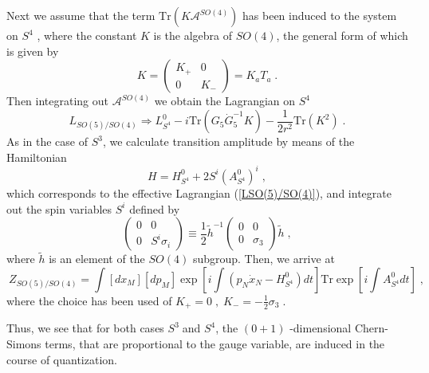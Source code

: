 \documentclass[12pt,a4paper]{article}
\begin{document}
Next we assume that the term $\mathrm{Tr}(K\mathcal{A}^{SO(4)})$ has been
induced to the system on $S^{4}$ , where the constant $K$ is the algebra of $%
SO(4)$, the general form of which is given by 
\begin{equation}
K=\left( 
\begin{array}{cc}
K_{+} & 0 \\ 
0 & K_{-}
\end{array}
\right) =K_{a}T_{a}\;.
\end{equation}
Then integrating out $\mathcal{A}^{SO(4)}$ we obtain the Lagrangian on $S^{4}
$ 
\begin{equation}
L_{SO(5)/SO(4)}\Rightarrow L_{S^{4}}^{0}-i\mathrm{Tr}(G_{5}\dot{G}%
_{5}^{-1}K)-\frac{1}{2r^{2}}\mathrm{Tr}(K^{2})\;.  \label{LSO(5)/SO(4)}
\end{equation}
As in the case of $S^{3}$, we calculate transition amplitude by means of the
Hamiltonian 
\begin{equation}
H=H_{S^{4}}^{0}+2S^{i}(A_{S^{4}}^{0})^{i}\;,
\end{equation}
which corresponds to the effective Lagrangian (\ref{LSO(5)/SO(4)}), and
integrate out the spin variables $S^{i}$ defined by 
\begin{equation}
\left( 
\begin{array}{cc}
0 & 0 \\ 
0 & S^{i}\sigma _{i}
\end{array}
\right) \equiv \frac{1}{2}\tilde{h}^{-1}\left( 
\begin{array}{cc}
0 & 0 \\ 
0 & \sigma _{3}
\end{array}
\right) \tilde{h}\;,
\end{equation}
where $\tilde{h}$ is an element of the $SO(4)$ subgroup. Then, we arrive at 
\begin{equation}
{\ }Z_{SO(5)/SO(4)}=\int [dx_{M}][dp_{M}]\exp \left[ i\int \left( p_{N}\dot{x%
}_{N}-H_{S^{4}}^{0}\right) dt\right] \mathrm{Tr}\exp \left[ i\int
A_{S^{4}}^{0}dt\right] \;,
\end{equation}
where the choice has been used of $K_{+}=0\;,\;K_{-}=-\frac{1}{2}\sigma
_{3}\;.$

Thus, we see that for both cases $S^{3}\;$and $S^{4}$, the $(0+1)$%
-dimensional Chern-Simons terms, that are proportional to the gauge
variable, are induced in the course of quantization.%
\quad%
%
\end{document}
